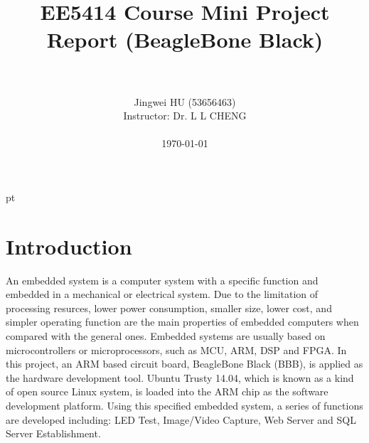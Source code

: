 \documentclass[12pt,journal,draftclsnofoot,onecolumn]{IEEEtran}
\begin{document}

 pt

\begin{titlepage}
\thispagestyle{empty}


\title{EE5414 Course Mini Project Report (BeagleBone Black)}

\author{\\
\author{\authorblockN}{Jingwei HU (53656463)}\\
Instructor: Dr. L L CHENG\\
\\
\today}

\maketitle
\end{titlepage}

{}
\clearpage

\section{Introduction}\label{Intro}
An embedded system is a computer system with a specific function and embedded in a mechanical or electrical system. Due to the limitation of processing resurces, lower power consumption, smaller size, lower cost, and simpler operating function are the main properties of embedded computers when compared with the general ones. Embedded systems are usually based on microcontrollers or microprocessors, such as MCU, ARM, DSP and FPGA. In this project, an ARM based circuit board, BeagleBone Black (BBB), is applied as the hardware development tool. Ubuntu Trusty 14.04, which is known as a kind of open source Linux system, is loaded into the ARM chip as the software development platform. Using this specified embedded system, a series of functions are developed including: LED Test, Image/Video Capture, Web Server and SQL Server Establishment.

\end{document}
